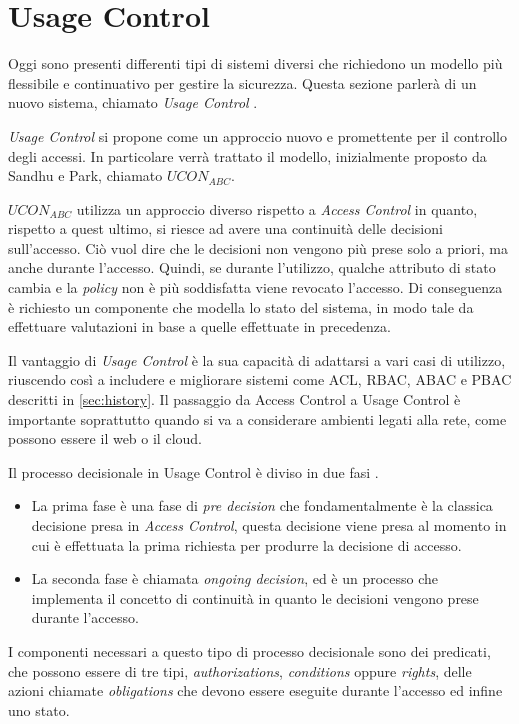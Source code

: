 \section{Usage Control} %
\label{sec:usage_control}
Oggi sono presenti differenti tipi di sistemi diversi che richiedono un modello più flessibile e continuativo per gestire la sicurezza. Questa sezione parlerà di un nuovo sistema, chiamato \textit{Usage Control} \cite{SurveyUsageControl}. \par
\textit{Usage Control} si propone come un approccio nuovo e promettente per il controllo degli accessi. In particolare verrà trattato il modello, inizialmente proposto da Sandhu e Park\cite{SurveyUsageControl}, chiamato $UCON_{ABC}$. \par
$UCON_{ABC}$ utilizza un approccio diverso rispetto a \textit{Access Control} in quanto, rispetto a quest ultimo, si riesce ad avere una continuità delle decisioni sull'accesso. Ciò vuol dire che le decisioni non vengono più prese solo a priori, ma anche durante l'accesso.  Quindi, se durante l'utilizzo, qualche attributo di stato cambia e la \textit{policy} non è più soddisfatta viene revocato l'accesso. Di conseguenza è richiesto un componente che modella lo stato del sistema, in modo tale da effettuare valutazioni in base a quelle effettuate in precedenza. \par
Il vantaggio di \textit{Usage Control} è la sua capacità di adattarsi a vari casi di utilizzo, riuscendo così a includere e migliorare sistemi come \ac{ACL}, \ac{RBAC}, \ac{ABAC} e \ac{PBAC} descritti in \ref{sec:history}.
Il passaggio da Access Control a Usage Control è importante soprattutto quando si va a considerare ambienti legati alla rete, come possono essere il web o il cloud. \par
Il processo decisionale in Usage Control è diviso in due fasi \cite{UsageControlCloud}. 
\begin{itemize}
\item La prima fase è una fase di \textit{pre decision} che fondamentalmente è la classica decisione presa in \textit{Access Control}, questa decisione viene presa al momento in cui è effettuata la prima richiesta per produrre la decisione di accesso.
\item La seconda fase è chiamata \textit{ongoing decision}, ed è un processo che implementa il concetto di continuità in quanto le decisioni vengono prese durante l'accesso.\par
\end{itemize}
I componenti necessari a questo tipo di processo decisionale sono dei predicati, che possono essere di tre tipi, \textit{authorizations}, \textit{conditions} oppure \textit{rights}, delle azioni chiamate \textit{obligations} che devono essere eseguite durante l'accesso ed infine uno stato. 
